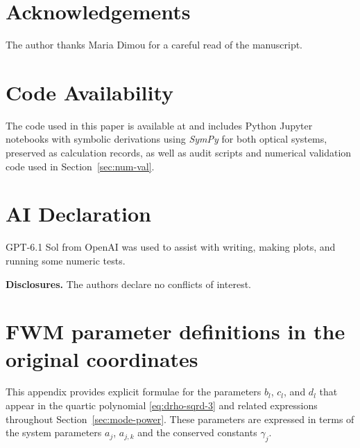 \documentclass[11pt,a4paper]{article}
\numberwithin{equation}{section}
\begin{document}
\section*{Acknowledgements}
The author thanks Maria Dimou for a careful read of the manuscript.

\section*{Code Availability}
The code used in this paper is available at \cite{heskethFWMAndCouplerPaper} and includes Python Jupyter notebooks with symbolic derivations using \emph{SymPy} \cite{meurerSymPySymbolicComputing2017} for both optical systems, preserved as calculation records, as well as audit scripts and numerical validation code used in Section~\ref{sec:num-val}.

\section*{AI Declaration}
GPT-6.1 Sol from OpenAI was used to assist with writing, making plots, and running some numeric tests.


\par\medskip
\noindent\textbf{Disclosures.} The authors declare no conflicts of interest.

\appendix



\section{FWM parameter definitions in the original coordinates}
\label{app:param-def-appendix}

This appendix provides explicit formulae for the parameters $b_l$, $c_l$, and $d_l$ that appear in the quartic polynomial \eqref{eq:drho-sqrd-3} and related expressions throughout Section~\ref{sec:mode-power}.
These parameters are expressed in terms of the system parameters $a_j$, $a_{j,k}$ and the conserved constants $\gamma_j$.
\end{document}
